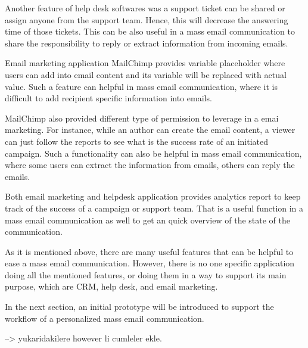 \begin{compactitem}
	\item Another feature of help desk softwares was a support ticket can be shared or assign anyone from the support team. Hence, this will decrease the answering time of those tickets. This can be also useful in a mass email communication to share the responsibility to reply or extract information from incoming emails.
	\item Email marketing application MailChimp provides variable placeholder where users can add into email content and its variable will be replaced with actual value. Such a feature can helpful in mass email communication, where it is difficult to add recipient specific information into emails.
	\item MailChimp also provided different type of permission to leverage in a emai marketing. For instance, while an author can create the email content, a viewer can just follow the reports to see what is the success rate of an initiated campaign. Such a functionality can also be helpful in mass email communication, where some users can extract the information from emails, others can reply the emails.
	\item Both email marketing and helpdesk application provides analytics report to keep track of the success of a campaign or support team. That is a useful function in a mass email communication as well to get an quick overview of the state of the communication.
\end{compactitem}

As it is mentioned above, there are many useful features that can be helpful to ease a mass email communication. However, there is no one specific application doing all the mentioned features, or doing them in a way to support its main purpose, which are \ac{CRM}, help desk, and email marketing.
\vspace{1cm}

In the next section, an initial prototype will be introduced to support the workflow of a personalized mass email communication.

--> yukaridakilere however li cumleler ekle.

